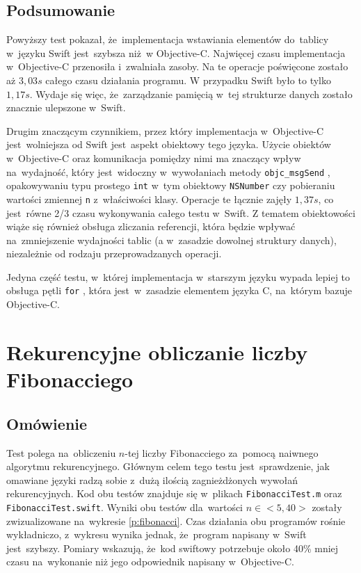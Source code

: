 \documentclass[mgr, shortabstract]{iithesis}
\newcommand{\objcinline}[1]{
    \texttt{#1}
}
\begin{document}
\subsection{Podsumowanie}

Powyższy test pokazał, że~implementacja wstawiania elementów do~tablicy w~języku Swift jest~szybsza niż w Objective-C. Najwięcej czasu implementacja w~Objective-C przenosiła i~zwalniała zasoby. Na te operacje poświęcone zostało aż $3,03s$ całego czasu działania programu. W przypadku Swift było to tylko $1,17s$. Wydaje się więc, że~zarządzanie pamięcią w~tej strukturze danych zostało znacznie ulepszone w~Swift.

Drugim znaczącym czynnikiem, przez który implementacja w~Objective-C jest~wolniejsza od Swift jest~aspekt obiektowy tego języka. Użycie obiektów w~Objective-C oraz komunikacja pomiędzy nimi ma znaczący wpływ na~wydajność, który jest~widoczny w~wywołaniach metody \objcinline{objc_msgSend}, opakowywaniu typu prostego \objcinline{int} w~tym obiektowy \objcinline{NSNumber} czy pobieraniu wartości zmiennej \objcinline{n} z~właściwości klasy. Operacje te łącznie zajęły $1,37s$, co jest~równe 2/3 czasu wykonywania całego testu w~Swift. Z tematem obiektowości wiąże się również obsługa zliczania referencji, która będzie wpływać na~zmniejszenie wydajności tablic (a w~zasadzie dowolnej struktury danych), niezależnie od rodzaju przeprowadzanych operacji.

Jedyna część testu, w~której implementacja w~starszym języku wypada lepiej to obsługa pętli \objcinline{for}, która jest~w~zasadzie elementem języka C, na~którym bazuje Objective-C.

\section{Rekurencyjne obliczanie liczby Fibonacciego}
\label{s:fibonacci}

\subsection{Omówienie}

Test polega na~obliczeniu $n$-tej liczby Fibonacciego za~pomocą naiwnego algorytmu rekurencyjnego. Głównym celem tego testu jest~sprawdzenie, jak omawiane języki radzą sobie z~dużą ilością zagnieżdżonych wywołań rekurencyjnych. Kod obu testów znajduje się w~plikach \texttt{FibonacciTest.m} oraz \texttt{FibonacciTest.swift}. Wyniki obu testów dla~wartości $n \in <5, 40>$ zostały zwizualizowane na~wykresie \ref{p:fibonacci}. Czas działania obu programów rośnie wykładniczo, z~wykresu wynika jednak, że~program napisany w~Swift jest~szybszy. Pomiary wskazują, że~kod swiftowy potrzebuje około 40\% mniej czasu na~wykonanie niż jego odpowiednik napisany w~Objective-C.
\end{document}
